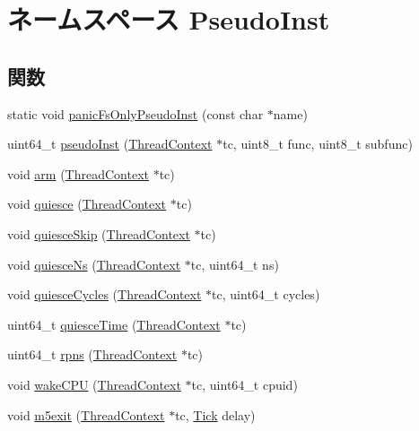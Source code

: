 \hypertarget{namespacePseudoInst}{
\section{ネームスペース PseudoInst}
\label{namespacePseudoInst}
}
\subsection*{関数}
\begin{DoxyCompactItemize}
\item 
static void \hyperlink{namespacePseudoInst_a0f1851194796f78b9481418d9021a748}{panicFsOnlyPseudoInst} (const char $\ast$name)
\item 
uint64\_\-t \hyperlink{namespacePseudoInst_a469ba8e314952a0076e086dee22ea6de}{pseudoInst} (\hyperlink{classThreadContext}{ThreadContext} $\ast$tc, uint8\_\-t func, uint8\_\-t subfunc)
\item 
void \hyperlink{namespacePseudoInst_a04d21e0b7e79b39e05106d93cac907a7}{arm} (\hyperlink{classThreadContext}{ThreadContext} $\ast$tc)
\item 
void \hyperlink{namespacePseudoInst_a977b8b2deadbfd9c0976dca7b75cfa08}{quiesce} (\hyperlink{classThreadContext}{ThreadContext} $\ast$tc)
\item 
void \hyperlink{namespacePseudoInst_a73e782e05ef938409cc211fe11a22e5e}{quiesceSkip} (\hyperlink{classThreadContext}{ThreadContext} $\ast$tc)
\item 
void \hyperlink{namespacePseudoInst_a1783da8f7e3427cb3656ae88329c9106}{quiesceNs} (\hyperlink{classThreadContext}{ThreadContext} $\ast$tc, uint64\_\-t ns)
\item 
void \hyperlink{namespacePseudoInst_a70caa4a44963eb294bfddbf67cdfc5d9}{quiesceCycles} (\hyperlink{classThreadContext}{ThreadContext} $\ast$tc, uint64\_\-t cycles)
\item 
uint64\_\-t \hyperlink{namespacePseudoInst_a89bd6a436c203e630bc715feab90fe13}{quiesceTime} (\hyperlink{classThreadContext}{ThreadContext} $\ast$tc)
\item 
uint64\_\-t \hyperlink{namespacePseudoInst_a80a5aaed64e395721c05798e013e3eba}{rpns} (\hyperlink{classThreadContext}{ThreadContext} $\ast$tc)
\item 
void \hyperlink{namespacePseudoInst_a09f94700f81d851f029c37019d7dde05}{wakeCPU} (\hyperlink{classThreadContext}{ThreadContext} $\ast$tc, uint64\_\-t cpuid)
\item 
void \hyperlink{namespacePseudoInst_af78146b46bc73f7ec13ab69b3f6e5779}{m5exit} (\hyperlink{classThreadContext}{ThreadContext} $\ast$tc, \hyperlink{base_2types_8hh_a5c8ed81b7d238c9083e1037ba6d61643}{Tick} delay)

\end{DoxyCompactItemize}
